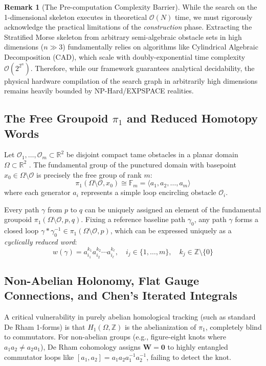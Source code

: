 \documentclass[11pt,reqno]{amsart}
\theoremstyle{definition}
\newtheorem{remark}[theorem]{Remark}
\providecommand{\R}{\mathbb{R}}
\newcommand{\Z}{\mathbb{Z}}
\numberwithin{equation}{section}
\providecommand{\R}{\mathbb{R}}
\begin{document}
\begin{remark}[The Pre-computation Complexity Barrier]
While the search on the 1-dimensional skeleton executes in theoretical $\mathcal{O}(N)$ time, we must rigorously acknowledge the practical limitations of the \emph{construction} phase. Extracting the Stratified Morse skeleton from arbitrary semi-algebraic obstacle sets in high dimensions ($n \gg 3$) fundamentally relies on algorithms like Cylindrical Algebraic Decomposition (CAD), which scale with doubly-exponential time complexity $\mathcal{O}(2^{2^n})$. Therefore, while our framework guarantees analytical decidability, the physical hardware compilation of the search graph in arbitrarily high dimensions remains heavily bounded by NP-Hard/EXPSPACE realities.
\end{remark}
 
\subsection{The Free Groupoid \texorpdfstring{$\pi_1$}{pi\_1} and Reduced Homotopy Words}
Let $\mathcal{O}_1, \dots, \mathcal{O}_m \subset \R^2$ be disjoint compact tame obstacles in a planar domain $\Omega \subset \R^2$ \cite{hatcher2002, bott1982}. The fundamental group of the punctured domain with basepoint $x_0 \in \Omega \setminus \mathcal{O}$ is precisely the free group of rank $m$:
\begin{equation}
\pi_1(\Omega \setminus \mathcal{O}, x_0) \cong \mathbb{F}_m = \langle a_1, a_2, \dots, a_m \rangle
\end{equation}
where each generator $a_i$ represents a simple loop encircling obstacle $\mathcal{O}_i$.

Every path $\gamma$ from $p$ to $q$ can be uniquely assigned an element of the fundamental groupoid $\pi_1(\Omega \setminus \mathcal{O}, p, q)$. Fixing a reference baseline path $\gamma_0$, any path $\gamma$ forms a closed loop $\gamma * \gamma_0^{-1} \in \pi_1(\Omega \setminus \mathcal{O}, p)$, which can be expressed uniquely as a \emph{cyclically reduced word}:
\begin{equation}
w(\gamma) = a_{i_1}^{k_1} a_{i_2}^{k_2} \cdots a_{i_\ell}^{k_\ell}, \quad i_j \in \{1, \dots, m\}, \quad k_j \in \Z \setminus \{0\}
\end{equation}

\subsection{Non-Abelian Holonomy, Flat Gauge Connections, and Chen's Iterated Integrals}
A critical vulnerability in purely abelian homological tracking (such as standard De Rham 1-forms) is that $H_1(\Omega, \Z)$ is the abelianization of $\pi_1$, completely blind to commutators. For non-abelian groups (e.g., figure-eight knots where $a_1 a_2 \neq a_2 a_1$), De Rham cohomology assigns $\mathbf{W} = \mathbf{0}$ to highly entangled commutator loops like $[a_1, a_2] = a_1 a_2 a_1^{-1} a_2^{-1}$, failing to detect the knot.
\end{document}
